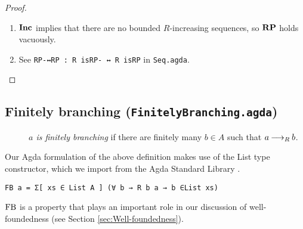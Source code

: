 \begin{proof} \hfill
    \begin{enumerate}
        \item $\mathbf{Inc}$ implies that there are no bounded $R$-increasing sequences,
        so $\mathbf{RP}$ holds vacuously.
        \item See \verb|RP-↔RP : R isRP- ↔ R isRP| in \texttt{Seq.agda}. \qedhere
    \end{enumerate}
\end{proof}

\subsection{Finitely branching (\texttt{FinitelyBranching.agda})}

\begin{definition} \hfill
    \begin{description}
        \item[] \emph{$a$ is finitely branching} if there are finitely many $b \in A$ such that $a \mathbin{\longrightarrow_R} b$.
    \end{description}
\end{definition}

Our Agda formulation of the above definition makes use of the List type constructor, which we import from the Agda Standard Library \cite{AgdaLibraryList}. 


\verb|FB a = Σ[ xs ∈ List A ] (∀ b → R b a → b ∈List xs)|

$\mathrm{FB}$ is a property that plays an important role in our discussion of well-foundedness (see Section \ref{sec:Well-foundedness}).



